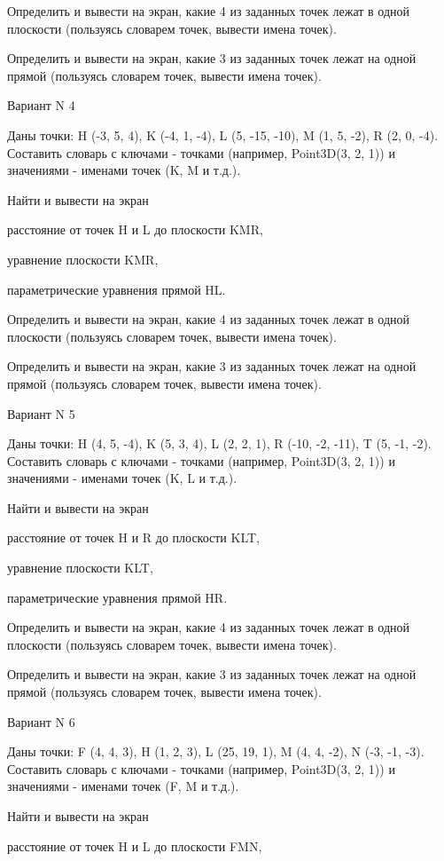 \documentclass[11pt]{report}
\begin{document}
Определить и вывести на экран, какие 4 из заданных точек лежат в одной плоскости (пользуясь словарем точек, вывести имена точек).


Определить и вывести на экран, какие 3 из заданных точек лежат на одной прямой (пользуясь словарем точек, вывести имена точек).

\newpage
Вариант N 4

Даны точки: H (-3, 5, 4), K (-4, 1, -4), L (5, -15, -10), M (1, 5, -2), R (2, 0, -4).
Составить словарь с ключами - точками (например, Point3D(3, 2, 1)) и значениями - именами точек (K, M и т.д.).


Найти и вывести на экран


расстояние от точек H и L до плоскости KMR,


уравнение плоскости KMR,


параметрические уравнения прямой HL.


Определить и вывести на экран, какие 4 из заданных точек лежат в одной плоскости (пользуясь словарем точек, вывести имена точек).


Определить и вывести на экран, какие 3 из заданных точек лежат на одной прямой (пользуясь словарем точек, вывести имена точек).

\newpage
Вариант N 5

Даны точки: H (4, 5, -4), K (5, 3, 4), L (2, 2, 1), R (-10, -2, -11), T (5, -1, -2).
Составить словарь с ключами - точками (например, Point3D(3, 2, 1)) и значениями - именами точек (K, L и т.д.).


Найти и вывести на экран


расстояние от точек H и R до плоскости KLT,


уравнение плоскости KLT,


параметрические уравнения прямой HR.


Определить и вывести на экран, какие 4 из заданных точек лежат в одной плоскости (пользуясь словарем точек, вывести имена точек).


Определить и вывести на экран, какие 3 из заданных точек лежат на одной прямой (пользуясь словарем точек, вывести имена точек).

\newpage
Вариант N 6

Даны точки: F (4, 4, 3), H (1, 2, 3), L (25, 19, 1), M (4, 4, -2), N (-3, -1, -3).
Составить словарь с ключами - точками (например, Point3D(3, 2, 1)) и значениями - именами точек (F, M и т.д.).


Найти и вывести на экран


расстояние от точек H и L до плоскости FMN,
\end{document}
